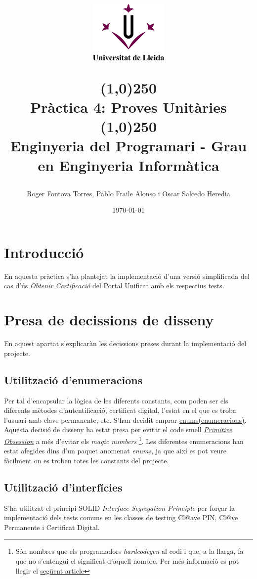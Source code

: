 \documentclass[12pt, letterpaper]{article}
\title{%
    \begin{center}
	\includegraphics[width=4cm,height=3cm]{udl.png}
    \end{center}
    \line(1,0){250}\\[0.3cm]
    \textbf{Pràctica 4: Proves Unitàries}
    \line(1,0){250}
    \\[0.5cm]
	\large Enginyeria del Programari - Grau en Enginyeria Informàtica
}
\author{Roger Fontova Torres, Pablo Fraile Alonso i Oscar Salcedo Heredia}
\date{\today}
\begin{document}
    
\maketitle
\thispagestyle{empty}
\newpage
\tableofcontents
\newpage


\section{Introducció}
\label{introduction}
En aquesta pràctica s'ha plantejat la implementació d'una versió simplificada del cas d'ús  \textit{Obtenir Certificació} del Portal Unificat amb els respectius tests. \\

\section{Presa de decissions de disseny}
\label{decissisions}
En aquest apartat s'explicaràn les decissions preses durant la implementació del projecte.

\subsection{Utilització d'enumeracions}
\label{enumeracions}
Per tal d'encapsular la lògica de les diferents constants, com poden ser els diferents mètodes d'autentificació, certificat digital, l'estat en el que es troba l'usuari amb clave permanente, etc. S'han decidit emprar \href{https://docs.oracle.com/javase/tutorial/java/javaOO/enum.html}{enums(enumeracions)}.\\

Aquesta decisió de disseny ha estat presa per evitar el code smell \href{https://refactoring.guru/smells/primitive-obsession}{\textit{Primitive Obsession}} a més d'evitar els \textit{magic numbers} \footnote{Són nombres que els programadors \textit{hardcodegen} al codi i que, a la llarga, fa que no s'entengui el significat d'aquell nombre. Per més informació es pot llegir el \href{https://en.wikipedia.org/wiki/Magic_number_(programming)}{següent article}}. Les diferentes enumeracions han estat afegides dins d'un paquet anomenat \textit{enums}, ja que així es pot veure fàcilment on es troben totes les constants del projecte.

\subsection{Utilització d'interfícies}
\label{interfaces}
S'ha utilitzat el principi SOLID \textit{Interface Segregation Principle} per forçar la implementació dels tests comuns en les classes de testing Cl@ave PIN, Cl@ve Permanente i Certificat Digital. \\
\end{document}
